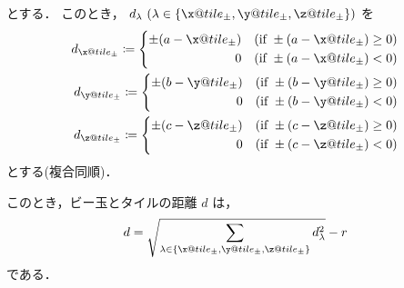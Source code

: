 {とする．
このとき，
\(d_\lambda \ (\lambda \in 
\{ \x@tile_\pm, \y@tile_\pm, \z@tile_\pm \})\)
を
\begin{align*}
  d_{\x@tile_\pm} \coloneqq
  \left\{ \begin{alignedat}{3}
    && \pm (a - \x@tile_\pm) &\quad (\text{if} \  \pm (a - \x@tile_\pm) \ge 0) \\
    &&0 &\quad (\text{if} \  \pm (a - \x@tile_\pm) < 0)
  \end{alignedat}
  \right. \\
  d_{\y@tile_\pm} \coloneqq
  \left\{ \begin{alignedat}{3}
    && \pm (b - \y@tile_\pm) &\quad (\text{if} \  \pm (b - \y@tile_\pm) \ge 0) \\
    &&0 &\quad (\text{if} \  \pm (b - \y@tile_\pm) < 0)
  \end{alignedat}
  \right. \\
  d_{\z@tile_\pm} \coloneqq
  \left\{ \begin{alignedat}{3}
    && \pm (c - \z@tile_\pm) &\quad (\text{if} \  \pm (c - \z@tile_\pm) \ge 0) \\
    &&0 &\quad (\text{if} \  \pm (c - \z@tile_\pm) < 0)
  \end{alignedat}
  \right.
\end{align*}
とする(複合同順)．

このとき，ビー玉とタイルの距離 \(d\) は，
\begin{align}
  d = \sqrt{\sum_{\lambda \in \{ \x@tile_\pm, \y@tile_\pm, \z@tile_\pm \}} d_\lambda^2}
  - r
\end{align}
である．
}
